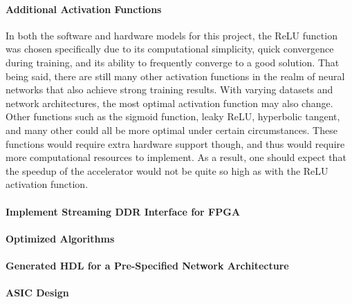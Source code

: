 \paragraph{Additional Activation Functions}
In both the software and hardware models for this project, the ReLU function was chosen specifically due to its computational simplicity, quick convergence during training, and its ability to frequently converge to a good solution. That being said, there are still many other activation functions in the realm of neural networks that also achieve strong training results. With varying datasets and network architectures, the most optimal activation function may also change. Other functions such as the sigmoid function, leaky ReLU, hyperbolic tangent, and many other could all be more optimal under certain circumstances. These functions would require extra hardware support though, and thus would require more computational resources to implement. As a result, one should expect that the speedup of the accelerator would not be quite so high as with the ReLU activation function.

\paragraph{Implement Streaming DDR Interface for FPGA}

\paragraph{Optimized Algorithms}

\paragraph{Generated HDL for a Pre-Specified Network Architecture}

\paragraph{ASIC Design}
